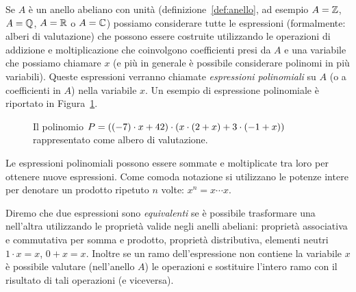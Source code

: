 Se $A$ è un anello abeliano con unità 
(definizione~\ref{def:anello}, 
ad esempio $A={\mathbb Z}$, $A={\mathbb Q}$, $A={\mathbb R}$ o $A={\mathbb C}$)
possiamo considerare tutte le espressioni
(formalmente: alberi di valutazione)
che possono essere costruite utilizzando le operazioni
di addizione e moltiplicazione che coinvolgono coefficienti presi da $A$
e una variabile che possiamo chiamare $x$ 
(e più in generale è possibile considerare polinomi in più variabili).
Queste espressioni verranno chiamate \emph{espressioni polinomiali}%
%
 su $A$
(o a coefficienti in $A$) nella variabile $x$. 
Un esempio di espressione polinomiale
è riportato in Figura~\ref{fig:49389}.
\begin{figure}
\begin{center}
\end{center}
\caption{Il polinomio $P = {\left( (-7)\cdot x + 42 \right)}\cdot(x\cdot (2+x) + 3\cdot(-1+x))$
rappresentato come albero di valutazione.}
\label{fig:49389}%
\end{figure}
Le espressioni polinomiali possono essere sommate e moltiplicate tra loro 
per ottenere nuove espressioni. 
Come comoda notazione si utilizzano le potenze intere per 
denotare un prodotto ripetuto $n$ volte: $x^n = x\cdots x$.

Diremo che due espressioni sono \emph{equivalenti} se è possibile trasformare 
una nell'altra utilizzando le proprietà valide negli anelli abeliani: 
proprietà associativa 
e commutativa per somma e prodotto, proprietà distributiva, elementi 
neutri $1\cdot x = x$, $0 + x = x$.
Inoltre se un ramo dell'espressione non contiene la variabile $x$ è possibile valutare 
(nell'anello $A$) le operazioni e sostituire l'intero ramo con il 
risultato di tali operazioni (e viceversa).

